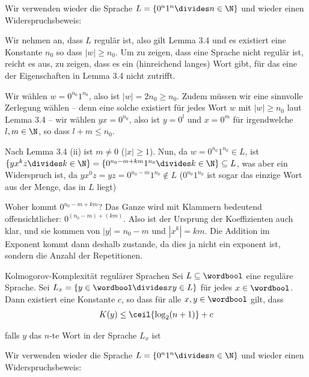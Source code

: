 \newpage
\numberingOff
\inlineex Wir verwenden wieder die Sprache $L = \{ 0^n 1^n \divides n \in \N \}$ und wieder einen Widerspruchsbeweis:

Wir nehmen an, dass $L$ regulär ist, also gilt Lemma 3.4 und es existiert eine Konstante $n_0$ so dass $|w| \geq n_0$.
Um zu zeigen, dass eine Sprache nicht regulär ist, reicht es aus, zu zeigen, dass es ein (hinreichend langes) Wort gibt, für das eine der Eigenschaften in Lemma 3.4 nicht zutrifft.

Wir wählen $w = 0^{n_0} 1^{n_0}$, also ist $|w| = 2n_0 \geq n_0$.
Zudem müssen wir eine sinnvolle Zerlegung wählen -- denn eine solche existiert für jedes Wort $w$ mit $|w| \geq n_0$ laut Lemma 3.4 --
wir wählen $yx = 0^{n_0}$, also ist $y = 0^l$ und $x = 0^m$ für irgendwelche $l, m \in \N$, so dass $l + m \leq n_0$.

Nach Lemma 3.4 (ii) ist $m \neq 0$ ($|x| \geq 1$).
Nun, da $w = 0^{n_0} 1^{n_0} \in L$, ist $\{ yx^kz \divides k \in \N \} = \{ 0^{n_0 - m + km} 1^{n_0} \divides k \in \N \} \subseteq L$, was aber ein Widerspruch ist,
da $yx^0z = yz = 0^{n_0 - m} 1^{n_0} \notin L$ ($0^{n_0}1^{n_0}$ ist sogar das einzige Wort aus der Menge, das in $L$ liegt)

\inlineintuition Woher kommt $0^{n_0 - m + km}$?
Das Ganze wird mit Klammern bedeutend offensichtlicher: $0^{(n_0 - m) + (km)}$.
Also ist der Ursprung der Koeffizienten auch klar, und sie kommen von $|y| = n_0 - m$ und $|x^k| = km$.
Die Addition im Exponent kommt dann deshalb zustande, da dies ja nicht ein exponent ist, sondern die Anzahl der Repetitionen.

\numberingOn


\begin{theorem}[]{Kolmogorov-Komplexität regulärer Sprachen}
    Sei $L \subseteq \wordbool$ eine reguläre Sprache. Sei $L_x = \{ y \in \wordbool \divides xy \in L \}$ für jedes $x \in \wordbool$.
    Dann existiert eine Konstante $c$, so dass für alle $x, y \in \wordbool$ gilt, dass
    \rmvspace
    \begin{align*}
        K(y) \leq \ceil{\log_2(n + 1)} + c
    \end{align*}

    \rmvspace
    falls $y$ das $n$-te Wort in der Sprache $L_x$ ist
\end{theorem}

\numberingOff
\inlineex Wir verwenden wieder die Sprache $L = \{ 0^n 1^n \divides n \in \N \}$ und wieder einen Widerspruchsbeweis:

